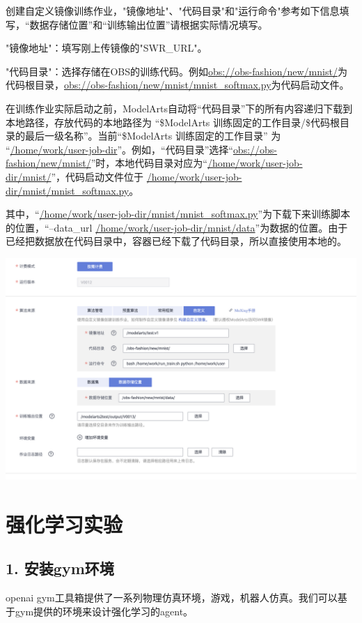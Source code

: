 \documentclass[fontset=windows,openany,UTF8]{ctexbook}
\begin{document}
创建自定义镜像训练作业，"镜像地址"、"代码目录"和"运行命令"参考如下信息填写，“数据存储位置”和“训练输出位置”请根据实际情况填写。

"镜像地址"：填写刚上传镜像的"SWR\_URL"。

"代码目录"：选择存储在OBS的训练代码。例如\url{obs://obs-fashion/new/mnist/}为代码根目录，\url{obs://obs-fashion/new/mnist/mnist_softmax.py}为代码启动文件。

在训练作业实际启动之前，ModelArts自动将“代码目录”下的所有内容递归下载到本地路径，存放代码的本地路径为 “\${ModelArts 训练固定的工作目录}/\${代码根目录的最后一级名称}”。当前“\${ModelArts 训练固定的工作目录}” 为 “\url{/home/work/user-job-dir}”。例如，“代码目录”选择“\url{obs://obs-fashion/new/mnist/}”时，本地代码目录对应为“\url{/home/work/user-job-dir/mnist/}”，代码启动文件位于 \url{/home/work/user-job-dir/mnist/mnist_softmax.py}。

其中，“\url{/home/work/user-job-dir/mnist/mnist_softmax.py}”为下载下来训练脚本的位置，“--data\_url \url{/home/work/user-job-dir/mnist/data}”为数据的位置。由于已经把数据放在代码目录中，容器已经下载了代码目录，所以直接使用本地的。

\includegraphics[scale=0.5]{./assets/kernel_02.png}  


\section{强化学习实验}

\subsection{1. 安装gym环境}

openai gym工具箱提供了一系列物理仿真环境，游戏，机器人仿真。我们可以基于gym提供的环境来设计强化学习的agent。
\end{document}
